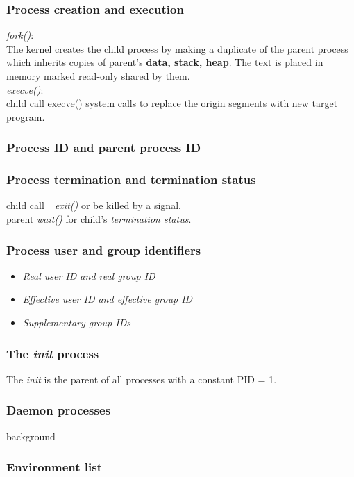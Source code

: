 \documentclass{article}
\numberwithin{equation}{section}
\numberwithin{figure}{section}
\begin{document}
\subsubsection*{Process creation and execution}
\textit{fork()}:\\
The kernel creates the child process by making a duplicate of the parent process which inherits copies of parent's \textbf{data, stack, heap}. The text is placed in memory marked read-only shared by them.\\
\textit{execve()}:\\
child call execve() system calls to replace the origin segments with new target program.

\subsubsection*{Process ID and parent process ID}
\subsubsection*{Process termination and termination status}
child call \textit{\_exit()} or be killed by a signal.\\
parent \textit{wait()} for child's \textit{termination status}.
\subsubsection*{Process user and group identifiers}
\begin{itemize}
\item \textit{Real user ID and real group ID}
\item \textit{Effective user ID and effective group ID}
\item \textit{Supplementary group IDs}
\end{itemize}

\subsubsection*{The \textit{init} process}
The \textit{init} is the parent of all processes with a constant PID = 1.\\

\subsubsection*{Daemon processes}
background
\subsubsection*{Environment list}
\end{document}
